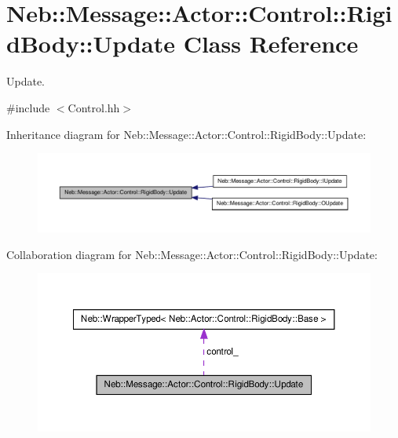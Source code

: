 \hypertarget{classNeb_1_1Message_1_1Actor_1_1Control_1_1RigidBody_1_1Update}{\section{\-Neb\-:\-:\-Message\-:\-:\-Actor\-:\-:\-Control\-:\-:\-Rigid\-Body\-:\-:\-Update \-Class \-Reference}
\label{classNeb_1_1Message_1_1Actor_1_1Control_1_1RigidBody_1_1Update}
}


\-Update.  




{\ttfamily \#include $<$\-Control.\-hh$>$}



\-Inheritance diagram for \-Neb\-:\-:\-Message\-:\-:\-Actor\-:\-:\-Control\-:\-:\-Rigid\-Body\-:\-:\-Update\-:\nopagebreak
\begin{figure}[H]
\begin{center}
\leavevmode
\includegraphics[width=350pt]{classNeb_1_1Message_1_1Actor_1_1Control_1_1RigidBody_1_1Update__inherit__graph}
\end{center}
\end{figure}


\-Collaboration diagram for \-Neb\-:\-:\-Message\-:\-:\-Actor\-:\-:\-Control\-:\-:\-Rigid\-Body\-:\-:\-Update\-:\nopagebreak
\begin{figure}[H]
\begin{center}
\leavevmode
\includegraphics[width=350pt]{classNeb_1_1Message_1_1Actor_1_1Control_1_1RigidBody_1_1Update__coll__graph}
\end{center}
\end{figure}
